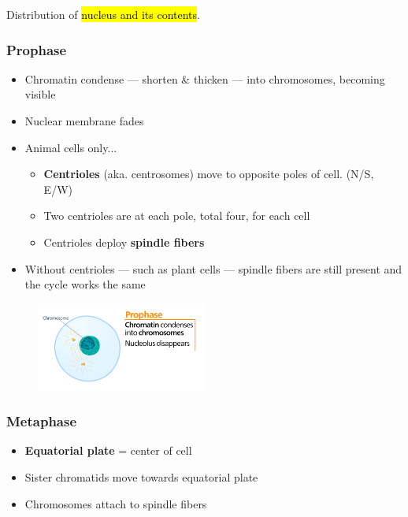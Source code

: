 \documentclass[a4paper,12pt]{article}
\begin{document}
Distribution of \hl{nucleus and its contents}.

\subsubsection{Prophase}
\begin{itemize}
    \item{Chromatin condense --- shorten \& thicken --- into chromosomes, becoming visible}
    \item{Nuclear membrane fades}
    \item{
            Animal cells only...
            \begin{itemize}
                \item{\textbf{Centrioles} (aka. centrosomes) move to opposite poles of cell. (N/S, E/W)}
                \item{Two centrioles are at each pole, total four, for each cell}
                \item{Centrioles deploy \textbf{spindle fibers}}
            \end{itemize}
        }
    \item{Without centrioles --- such as plant cells --- spindle fibers are still present and the cycle works the same}
\end{itemize}

\begin{figure}[H]
    \centering
    \includegraphics[width=0.5\textwidth]{prophase}
\end{figure}

\subsubsection{Metaphase}
\begin{itemize}
    \item{\textbf{Equatorial plate} = center of cell}
    \item{Sister chromatids move towards equatorial plate}
    \item{Chromosomes attach to spindle fibers}
\end{itemize}
\end{document}
